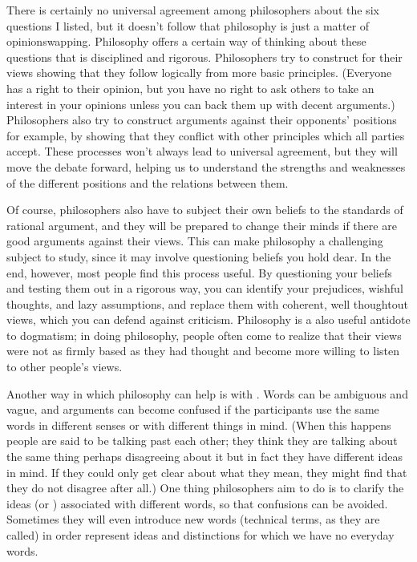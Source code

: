 \documentclass[letterpaper,10pt,english]{sphinxmanual}
\begin{document}
There is certainly no universal agreement among philosophers about the six questions I listed, but it doesn’t follow that philosophy is just a matter of opinion\sphinxhyphen{}swapping. Philosophy offers a certain way of thinking about these questions that is disciplined and rigorous. Philosophers try to construct  for their views \textendash{} showing that they follow logically from more basic principles. (Everyone has a right to their opinion, but you have no right to ask others to take an interest
in your opinions unless you can back them up with decent arguments.) Philosophers also try to construct arguments against their opponents’ positions \textendash{} for example, by showing that they conflict with other principles which all parties accept. These processes won’t always lead to universal agreement, but they will move the debate forward, helping us to understand the strengths and weaknesses of the different positions and the relations between them.

Of course, philosophers also have to subject their own beliefs to the standards of rational argument, and they will be prepared to change their minds if there are good arguments against their views. This can make philosophy a challenging subject to study, since it may involve questioning beliefs you hold dear. In the end, however, most people find this process useful. By questioning your beliefs and testing them out in a rigorous way, you can identify your prejudices, wishful thoughts, and lazy
assumptions, and replace them with coherent, well thought\sphinxhyphen{}out views, which you can defend against criticism. Philosophy is a also useful antidote to dogmatism; in doing philosophy, people often come to realize that their views were not as firmly based as they had thought and become more willing to listen to other people’s views.

Another way in which philosophy can help is with . Words can be ambiguous and vague, and arguments can become confused if the participants use the same words in different senses or with different things in mind. (When this happens people are said to be talking past each other; they think they are talking about the same thing \textendash{} perhaps disagreeing about it \textendash{} but in fact they have different ideas in mind. If they could only get clear about what they mean, they might find that they do not
disagree after all.) One thing philosophers aim to do is to clarify the ideas (or ) associated with different words, so that confusions can be avoided. Sometimes they will even introduce new words (technical terms, as they are called) in order represent ideas and distinctions for which we have no everyday words.
\end{document}
